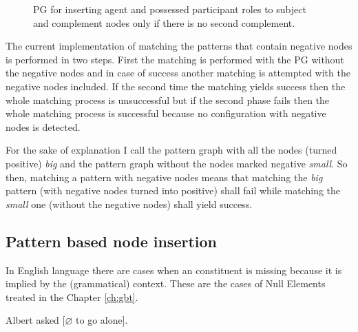\begin{figure}[hbtp]
\centering
{}
\caption{PG for inserting agent and possessed participant roles to subject and complement nodes only if there is no second complement.}
\label{fig:gp4}
\end{figure}

The current implementation of matching the patterns that contain negative nodes is performed in two steps. First the matching is performed with the PG without the negative nodes and in case of success another matching is attempted with the negative nodes included. If the second time the matching yields success then the whole matching process is unsuccessful but if the second phase fails then the whole matching process is successful because no configuration with negative nodes is detected.

For the sake of explanation I call the pattern graph with all the nodes (turned positive) \textit{big} and the pattern graph without the nodes marked negative \textit{small}. So then, matching a pattern with negative nodes means that matching the \textit{big} pattern (with negative nodes turned into positive) shall fail while matching the \textit{small} one (without the negative nodes) shall yield success.

%
\subsection{Pattern based node insertion} 
In English language there are cases when an constituent is missing because it is implied by the (grammatical) context. These are the cases of Null Elements treated in the Chapter \ref{ch:gbt}. 

\begin{exe}
	\ex\label{ex:albert} Albert asked [$\varnothing$ to go alone].
\end{exe}

